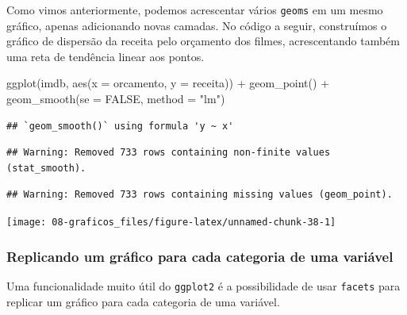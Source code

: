 \documentclass[
]{book}
\newenvironment{Shaded}{\begin{snugshade}}{\end{snugshade}}
\newcommand{\AttributeTok}[1]{\textcolor[rgb]{0.77,0.63,0.00}{#1}}
\newcommand{\ConstantTok}[1]{\textcolor[rgb]{0.00,0.00,0.00}{#1}}
\newcommand{\FunctionTok}[1]{\textcolor[rgb]{0.00,0.00,0.00}{#1}}
\newcommand{\NormalTok}[1]{#1}
\newcommand{\SpecialCharTok}[1]{\textcolor[rgb]{0.00,0.00,0.00}{#1}}
\newcommand{\StringTok}[1]{\textcolor[rgb]{0.31,0.60,0.02}{#1}}
\begin{document}
Como vimos anteriormente, podemos acrescentar vários \texttt{geoms} em um mesmo gráfico, apenas adicionando novas camadas. No código a seguir, construímos o gráfico de dispersão da receita pelo orçamento dos filmes, acrescentando também uma reta de tendência linear aos pontos.

\begin{Shaded}
\begin{Highlighting}[]
\FunctionTok{ggplot}\NormalTok{(imdb, }\FunctionTok{aes}\NormalTok{(}\AttributeTok{x =}\NormalTok{ orcamento, }\AttributeTok{y =}\NormalTok{ receita)) }\SpecialCharTok{+}
  \FunctionTok{geom\_point}\NormalTok{() }\SpecialCharTok{+}
  \FunctionTok{geom\_smooth}\NormalTok{(}\AttributeTok{se =} \ConstantTok{FALSE}\NormalTok{, }\AttributeTok{method =} \StringTok{"lm"}\NormalTok{)}
\end{Highlighting}
\end{Shaded}

\begin{verbatim}
## `geom_smooth()` using formula 'y ~ x'
\end{verbatim}

\begin{verbatim}
## Warning: Removed 733 rows containing non-finite values (stat_smooth).
\end{verbatim}

\begin{verbatim}
## Warning: Removed 733 rows containing missing values (geom_point).
\end{verbatim}

\begin{center}\texttt{[image: 08-graficos\_files/figure-latex/unnamed-chunk-38-1]} \end{center}

\hypertarget{replicando-um-gruxe1fico-para-cada-categoria-de-uma-variuxe1vel}{%
\subsubsection*{Replicando um gráfico para cada categoria de uma variável}\label{replicando-um-gruxe1fico-para-cada-categoria-de-uma-variuxe1vel}}

Uma funcionalidade muito útil do \texttt{ggplot2} é a possibilidade de usar \texttt{facets} para replicar um gráfico para cada categoria de uma variável.
\end{document}
